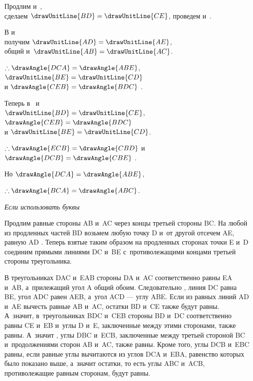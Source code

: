 \documentclass[letters,booklanguage=russian]{byrnebook}
\begin{document}
\begin{center}
Продлим  и~,\drawCurrentPictureInMargin\\
сделаем $\drawUnitLine{BD} = \drawUnitLine{CE}$, проведем  и~.

В
и
\\
получим $\drawUnitLine{AD} = \drawUnitLine{AE}$,\\
 общий и~$\drawUnitLine{AB} = \drawUnitLine{AC}$.

$\therefore \drawAngle{DCA} = \drawAngle{ABE}$, $\drawUnitLine{BE} = \drawUnitLine{CD}$\\
и $\drawAngle{CEB} = \drawAngle{BDC}$ .

Теперь в~ и~\\
$\drawUnitLine{BD} = \drawUnitLine{CE}$, $\drawAngle{CEB} = \drawAngle{BDC}$\\
и $\drawUnitLine{BE} = \drawUnitLine{CD}$.

$\therefore \drawAngle{ECB} = \drawAngle{CBD}$
и $\drawAngle{DCB} = \drawAngle{CBE}$ .

Но $\drawAngle{DCA} = \drawAngle{ABE}$, 

$\therefore \drawAngle{BCA} = \drawAngle{ABC}$.
\end{center}

\qedNB

\begin{center}
\emph{Если использовать буквы}
\end{center}

Продлим равные стороны AB и~AC через концы третьей стороны BC. На любой из продленных частей BD возьмем любую точку D и~от другой отсечем AE, равную AD . Теперь взятые таким образом на продленных сторонах точки E и~D соединим прямыми линиями DC и~BE с~противолежащими концами третьей стороны треугольника.

В треугольниках DAC и~EAB стороны DA и~AC соответственно равны EA и~AB, а~прилежащий угол A общий обоим. Следовательно , линия DC равна BE, угол ADC равен AEB, а~угол ACD — углу ABE. Если из равных линий AD и~AE вычесть равные AB и~AC, остатки BD и~CE также будут равны. А~значит, в~треугольниках BDC и~CEB стороны BD и~DC соответственно равны CE и~EB и~углы D и~E, заключенные между этими сторонами, также равны. А~значит , углы DBC и~ECB, заключенные между третьей стороной BC и~продолжениями сторон AB и~AC, также равны. Кроме того, углы DCB и~EBC равны, если равные углы вычитаются из углов DCA и~EBA, равенство которых было показано выше, а~значит остатки, то есть углы ABC и~ACB, противолежащие равным сторонам, будут равны.
\end{document}
